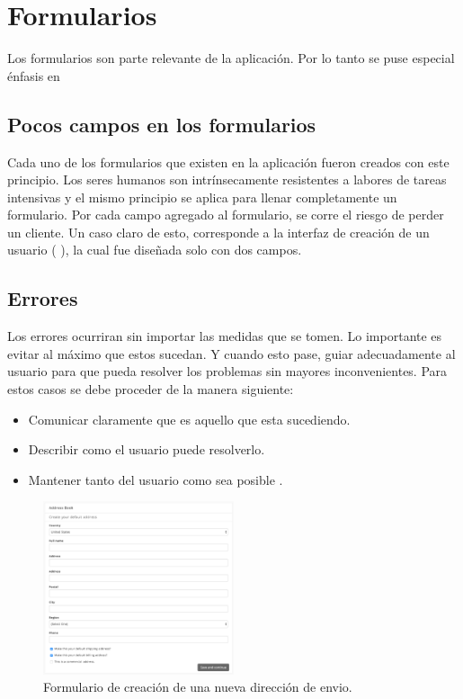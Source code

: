 \section{Formularios}

Los formularios son parte relevante de la aplicación. Por lo tanto se puse especial énfasis en 

\subsection{Pocos campos en los formularios}
Cada uno de los formularios que existen en la aplicación fueron creados con este principio. Los seres humanos son intrínsecamente resistentes a labores de tareas intensivas y el mismo principio se aplica para llenar completamente un formulario. Por cada campo agregado al formulario, se corre el riesgo de perder un cliente\cite{online_goodgui_org}.
Un caso claro de esto, corresponde a la interfaz de creación de un usuario ( ), la cual fue diseñada solo con dos campos.


\subsection{Errores}
Los errores ocurriran sin importar las medidas que se tomen. Lo importante es evitar al máximo que estos sucedan. Y cuando esto pase, guiar adecuadamente al usuario para que pueda resolver los problemas sin mayores inconvenientes. Para estos casos se debe proceder de la manera siguiente:
\begin{itemize}
	\item Comunicar claramente que es aquello que esta sucediendo.
	\item Describir como el usuario puede resolverlo.
	\item Mantener tanto  del usuario como sea posible \cite{online_google_ui_pattern_error}.
\end{itemize} 


\begin{figure}[H]
	\centering
	\includegraphics[width=0.5\textwidth]{figuras/formularios/form_address_book.png}

	\caption{Formulario de creación de una nueva dirección de envio.}
	\label{figure:form:form_address_book}
\end{figure}













